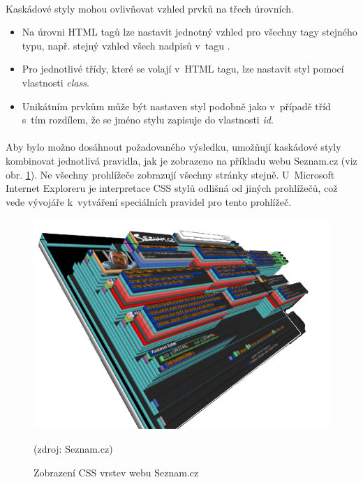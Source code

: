 \documentclass[11pt,a4paper,titlepage,oneside]{book}
\begin{document}

		\paragraph{} Kaskádové styly mohou ovlivňovat vzhled prvků na třech úrovních.
				\begin{itemize}
					\item Na úrovni \ac{HTML} tagů lze nastavit jednotný vzhled pro všechny tagy stejného typu, např. stejný vzhled všech nadpisů v~tagu .
					\item Pro jednotlivé třídy, které se volají v~\ac{HTML} tagu, lze nastavit styl pomocí vlastnosti \textit{class}.
					\item Unikátním prvkům může být nastaven styl podobně jako v~případě tříd s~tím rozdílem, že se jméno stylu zapisuje do vlastnosti \textit{id}.
				\end{itemize}



		\paragraph{} Aby bylo možno dosáhnout požadovaného výsledku, umožňují kaskádové styly kombinovat jednotlivá pravidla, jak je zobrazeno na příkladu webu Seznam.cz (viz obr. \ref{fig:seznam}). Ne všechny prohlížeče zobrazují všechny stránky stejně. U~Microsoft Internet Exploreru je interpretace CSS stylů odlišná od jiných prohlížečů, což vede vývojáře k~vytváření speciálních pravidel pro tento prohlížeč.
		\begin{figure}[!h]
			\begin{center}
				\includegraphics[width=12cm]{obrazky/css_vrstvy.png}
				\caption{Zobrazení CSS vrstev webu Seznam.cz}
				\label{fig:seznam}
				(zdroj: Seznam.cz)
			\end{center}
		\end{figure}	
\end{document}
